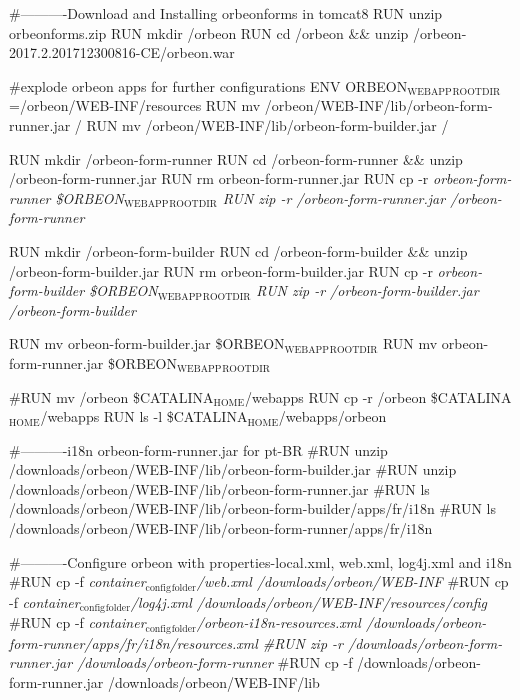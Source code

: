 \documentclass[presentation]{beamer}
\begin{document}
\#----------Download and Installing orbeonforms in tomcat8
RUN unzip  orbeonforms.zip
RUN mkdir /orbeon 
RUN cd /orbeon \&\&  unzip /orbeon-2017.2.201712300816-CE/orbeon.war

\#explode orbeon apps for further configurations
ENV ORBEON\(_{\text{WEBAPP}}\)\(_{\text{ROOTDIR}}\)=/orbeon/WEB-INF/resources
RUN mv /orbeon/WEB-INF/lib/orbeon-form-runner.jar /
RUN mv /orbeon/WEB-INF/lib/orbeon-form-builder.jar /

RUN mkdir /orbeon-form-runner
RUN cd /orbeon-form-runner \&\& unzip /orbeon-form-runner.jar
RUN rm orbeon-form-runner.jar
RUN cp -r \emph{orbeon-form-runner \$ORBEON\(_{\text{WEBAPP}}\)\(_{\text{ROOTDIR}}\)
RUN zip -r /orbeon-form-runner.jar /orbeon-form-runner}

RUN mkdir /orbeon-form-builder
RUN cd /orbeon-form-builder \&\& unzip /orbeon-form-builder.jar
RUN rm orbeon-form-builder.jar
RUN cp -r \emph{orbeon-form-builder \$ORBEON\(_{\text{WEBAPP}}\)\(_{\text{ROOTDIR}}\)
RUN zip -r /orbeon-form-builder.jar /orbeon-form-builder}

RUN mv orbeon-form-builder.jar   \$ORBEON\(_{\text{WEBAPP}}\)\(_{\text{ROOTDIR}}\)
RUN mv orbeon-form-runner.jar  \$ORBEON\(_{\text{WEBAPP}}\)\(_{\text{ROOTDIR}}\)



\#RUN mv /orbeon \$CATALINA\(_{\text{HOME}}\)/webapps
RUN cp -r /orbeon \$CATALINA\(_{\text{HOME}}\)/webapps
RUN ls -l \$CATALINA\(_{\text{HOME}}\)/webapps/orbeon


\#----------i18n orbeon-form-runner.jar for pt-BR
\#RUN unzip /downloads/orbeon/WEB-INF/lib/orbeon-form-builder.jar
\#RUN unzip /downloads/orbeon/WEB-INF/lib/orbeon-form-runner.jar
\#RUN ls /downloads/orbeon/WEB-INF/lib/orbeon-form-builder/apps/fr/i18n
\#RUN ls /downloads/orbeon/WEB-INF/lib/orbeon-form-runner/apps/fr/i18n



\#----------Configure orbeon with properties-local.xml,  web.xml, log4j.xml and i18n
\#RUN cp -f \emph{container\(_{\text{config}}\)\(_{\text{folder}}\)/web.xml /downloads/orbeon/WEB-INF}
\#RUN cp -f \emph{container\(_{\text{config}}\)\(_{\text{folder}}\)/log4j.xml /downloads/orbeon/WEB-INF/resources/config}
\#RUN cp -f \emph{container\(_{\text{config}}\)\(_{\text{folder}}\)/orbeon-i18n-resources.xml /downloads/orbeon-form-runner/apps/fr/i18n/resources.xml
\#RUN zip -r /downloads/orbeon-form-runner.jar /downloads/orbeon-form-runner}
\#RUN cp -f /downloads/orbeon-form-runner.jar /downloads/orbeon/WEB-INF/lib
\end{document}
